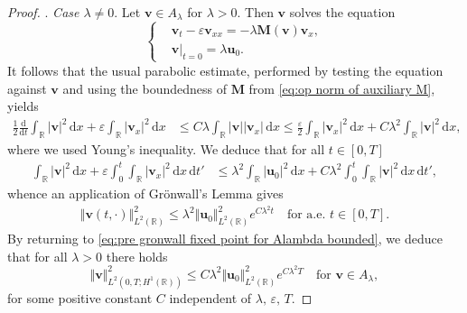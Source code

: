 \documentclass[11pt,a4paper,reqno]{amsart}
\numberwithin{equation}{section}
\theoremstyle{definition}
\theoremstyle{remark}
\newcommand{\bu}{\mathbf{u}}
\newcommand{\bv}{\mathbf{v}}
\renewcommand{\d}{\, \mathrm{d}}
\newcommand{\der}{\mathrm{d}}
\newcommand{\bM}{\mathbf{M}}
\renewcommand{\leq}{\leqslant}
\begin{document}
{\begin{proof}
. \textit{Case $\lambda \neq 0$}. Let $\bv \in A_\lambda$ for $\lambda > 0$. Then $\bv$ solves the equation 
\begin{equation*}
    \left\lbrace  \begin{aligned}
        & \bv_t - \varepsilon\bv_{xx} =  -\lambda \bM(\bv)\bv_x, \\ 
        & \bv|_{t=0} = \lambda \bu_0. 
    \end{aligned} \right. 
\end{equation*}
It follows that the usual parabolic estimate, performed by testing the equation against $\bv$ and using the boundedness of $\bM$ from \eqref{eq:op norm of auxiliary M}, yields 
\begin{equation*}
 \begin{aligned}   \frac{1}{2}\frac{\der}{\der t}\int_{\mathbb{R}} |\bv|^2 \d x + \varepsilon \int_{\mathbb{R}} |\bv_x|^2 \d x &\leq C\lambda\int_{\mathbb{R}} |\bv| |\bv_x | \d x \leq \frac{\varepsilon}{2}\int_\mathbb{R} |\bv_x|^2 \d x + C\lambda^2 \int_\mathbb{R} |\bv|^2 \d x ,
 \end{aligned}
\end{equation*}
where we used Young's inequality. We deduce that for all $t \in [0,T]$
\begin{equation}\label{eq:pre gronwall fixed point for Alambda bounded}
   \begin{aligned} \int_{\mathbb{R}} |\bv|^2 \d x + \varepsilon \int_0^t \int_{\mathbb{R}} |\bv_x|^2 \d x \d t' &\leq \lambda^2 \int_{\mathbb{R}} |\bu_0|^2 \d x + C\lambda^2 \int_0^t \int_{\mathbb{R}} |\bv|^2 \d x \d t', 
   \end{aligned}
\end{equation}
whence an application of Gr\"onwall's Lemma gives 
\begin{equation*}
   \begin{aligned} \Vert \bv(t,\cdot) \Vert^2_{L^2(\mathbb{R})} \leq \lambda^2 \Vert \bu_0 \Vert^2_{L^2(\mathbb{R})} e^{C\lambda^2 t} \quad \text{for a.e.~} t \in [0,T]. 
   \end{aligned}
\end{equation*}
By returning to \eqref{eq:pre gronwall fixed point for Alambda bounded}, we deduce that for all $\lambda > 0$ there holds 
\begin{equation}\label{eq:for lambda nonzero L2H1 bound}
    \Vert \bv \Vert_{L^2(0,T;H^1(\mathbb{R}))}^2 \leq C\lambda^2 \Vert \bu_0 \Vert_{L^2(\mathbb{R})}^2 e^{C \lambda^2 T} \quad \text{for } \bv \in A_\lambda, 
\end{equation}
for some positive constant $C$ independent of $\lambda, \, \varepsilon, \, T$. 


\end{proof}}
\end{document}
